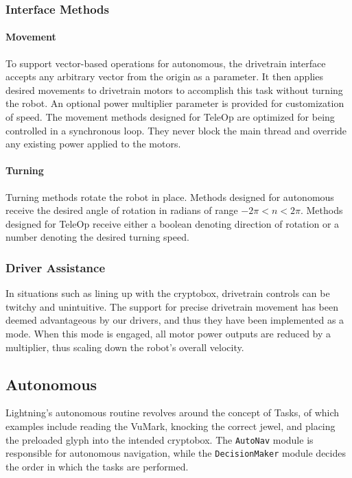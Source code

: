 \documentclass[letterpaper]{article}
\begin{document}
\subsubsection{Interface Methods}

\paragraph{Movement}
To support vector-based operations for autonomous, the drivetrain interface accepts any arbitrary vector from the origin as a parameter. It then applies desired movements to drivetrain motors to accomplish this task without turning the robot. An optional power multiplier parameter is provided for customization of speed. The movement methods designed for TeleOp are optimized for being controlled in a synchronous loop. They never block the main thread and override any existing power applied to the motors.

\paragraph{Turning}
Turning methods rotate the robot in place. Methods designed for autonomous receive the desired angle of rotation in radians of range $-2\pi < n < 2\pi$. Methods designed for TeleOp receive either a boolean denoting direction of rotation or a number denoting the desired turning speed.


\subsubsection{Driver Assistance}
In situations such as lining up with the cryptobox, drivetrain controls can be twitchy and unintuitive. The support for precise drivetrain movement has been deemed advantageous by our drivers, and thus they have been implemented as a mode. When this mode is engaged, all motor power outputs are reduced by a multiplier, thus scaling down the robot's overall velocity.

\subsection{Autonomous}
Lightning's autonomous routine revolves around the concept of Tasks, of which examples include reading the VuMark, knocking the correct jewel, and placing the preloaded glyph into the intended cryptobox. The \texttt{AutoNav} module is responsible for autonomous navigation, while the \texttt{DecisionMaker} module decides the order in which the tasks are performed.
\end{document}
